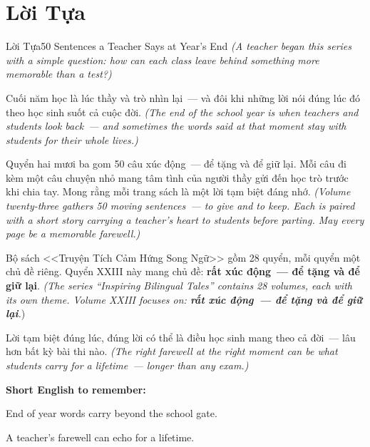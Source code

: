 \chapter*{Lời Tựa}

\begin{truyen}{Lời Tựa}{50 Sentences a Teacher Says at Year's End}
\textit{(A teacher began this series with a simple question: how can each class leave behind something more memorable than a test?)}

Cuối năm học là lúc thầy và trò nhìn lại~--- và đôi khi những lời nói đúng lúc đó theo học sinh suốt cả cuộc đời.
\textit{(The end of the school year is when teachers and students look back~--- and sometimes the words said at that moment stay with students for their whole lives.)}

Quyển hai mươi ba gom 50 câu xúc động~--- để tặng và để giữ lại. Mỗi câu đi kèm một câu chuyện nhỏ mang tâm tình của người thầy gửi đến học trò trước khi chia tay. Mong rằng mỗi trang sách là một lời tạm biệt đáng nhớ.
\textit{(Volume twenty-three gathers 50 moving sentences~--- to give and to keep. Each is paired with a short story carrying a teacher's heart to students before parting. May every page be a memorable farewell.)}

Bộ sách <<Truyện Tích Cảm Hứng Song Ngữ>> gồm 28 quyển, mỗi quyển một chủ đề riêng. Quyển XXIII này mang chủ đề: \textbf{rất xúc động~--- để tặng và để giữ lại}.
\textit{(The series ``Inspiring Bilingual Tales'' contains 28 volumes, each with its own theme. Volume XXIII focuses on: \textbf{rất xúc động~--- để tặng và để giữ lại}.})
\end{truyen}

\begin{baihoc}
Lời tạm biệt đúng lúc, đúng lời có thể là điều học sinh mang theo cả đời~--- lâu hơn bất kỳ bài thi nào.
\textit{(The right farewell at the right moment can be what students carry for a lifetime~--- longer than any exam.)}
\end{baihoc}

\begin{ghinhoanh}
\textbf{Short English to remember:}

End of year words carry beyond the school gate.

A teacher's farewell can echo for a lifetime.
\end{ghinhoanh}

